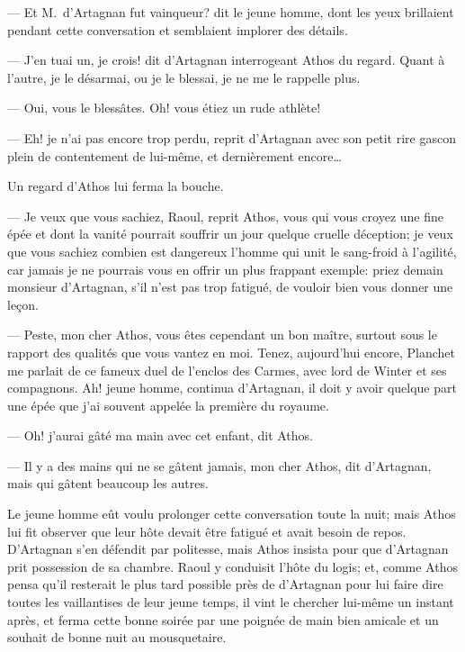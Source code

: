 — Et M.~d'Artagnan fut vainqueur? dit le jeune homme, dont les yeux brillaient pendant cette conversation et semblaient implorer des détails.

— J'en tuai un, je crois! dit d'Artagnan interrogeant Athos du regard. Quant à l'autre, je le désarmai, ou je le blessai, je ne me le rappelle plus.

— Oui, vous le blessâtes. Oh! vous étiez un rude athlète!

— Eh! je n'ai pas encore trop perdu, reprit d'Artagnan avec son petit rire gascon plein de contentement de lui-même, et dernièrement encore\dots

Un regard d'Athos lui ferma la bouche.

— Je veux que vous sachiez, Raoul, reprit Athos, vous qui vous croyez une fine épée et dont la vanité pourrait souffrir un jour quelque cruelle déception; je veux que vous sachiez combien est dangereux l'homme qui unit le sang-froid à l'agilité, car jamais je ne pourrais vous en offrir un plus frappant exemple: priez demain monsieur d'Artagnan, s'il n'est pas trop fatigué, de vouloir bien vous donner une leçon.

— Peste, mon cher Athos, vous êtes cependant un bon maître, surtout sous le rapport des qualités que vous vantez en moi. Tenez, aujourd'hui encore, Planchet me parlait de ce fameux duel de l'enclos des Carmes, avec lord de Winter et ses compagnons. Ah! jeune homme, continua d'Artagnan, il doit y avoir quelque part une épée que j'ai souvent appelée la première du royaume.

— Oh! j'aurai gâté ma main avec cet enfant, dit Athos.

— Il y a des mains qui ne se gâtent jamais, mon cher Athos, dit d'Artagnan, mais qui gâtent beaucoup les autres.

Le jeune homme eût voulu prolonger cette conversation toute la nuit; mais Athos lui fit observer que leur hôte devait être fatigué et avait besoin de repos. D'Artagnan s'en défendit par politesse, mais Athos insista pour que d'Artagnan prit possession de sa chambre. Raoul y conduisit l'hôte du logis; et, comme Athos pensa qu'il resterait le plus tard possible près de d'Artagnan pour lui faire dire toutes les vaillantises de leur jeune temps, il vint le chercher lui-même un instant après, et ferma cette bonne soirée par une poignée de main bien amicale et un souhait de bonne nuit au mousquetaire.